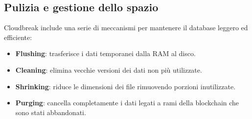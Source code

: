 \documentclass[a4paper,12pt]{report}
\begin{document}
	\subsection{Pulizia e gestione dello spazio}
	Cloudbreak include una serie di meccanismi per mantenere il database leggero ed efficiente:
	\begin{itemize}
		\item \textbf{Flushing}: trasferisce i dati temporanei dalla RAM al disco.
		\item \textbf{Cleaning}: elimina vecchie versioni dei dati non più utilizzate.
		\item \textbf{Shrinking}: riduce le dimensioni dei file rimuovendo porzioni inutilizzate.
		\item \textbf{Purging}: cancella completamente i dati legati a rami della blockchain che sono stati abbandonati.
	\end{itemize}
	
\end{document}
